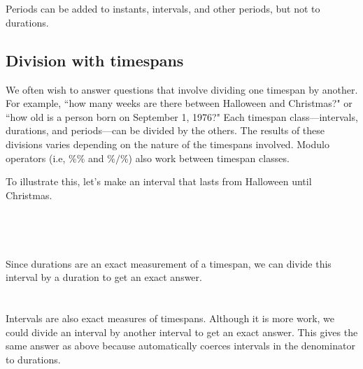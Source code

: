 \documentclass[article]{jss}
\begin{document}
\\
\\

Periods can be added to instants, intervals, and other periods, but not to durations.


\subsection{Division with timespans}

We often wish to answer questions that involve dividing one timespan by another. For example, ``how many weeks are there between Halloween and Christmas?" or ``how old is a person born on September 1, 1976?" Each timespan class---intervals, durations, and periods---can be divided by the others. The results of these divisions varies depending on the nature of the timespans involved. Modulo operators (i.e, $\%\%$ and $\%/\%$) also work between timespan classes.

To illustrate this, let's make an interval that lasts from Halloween until Christmas.\\

\\
\\
\\
\\

Since durations are an exact measurement of a timespan, we can divide this interval by a duration to get an exact answer.\\

\\
\\

Intervals are also exact measures of timespans. Although it is more work, we could divide an interval by another interval to get an exact answer. This gives the same answer as above because  automatically coerces intervals in the denominator to durations.\\

\\
\\
\\
\end{document}
